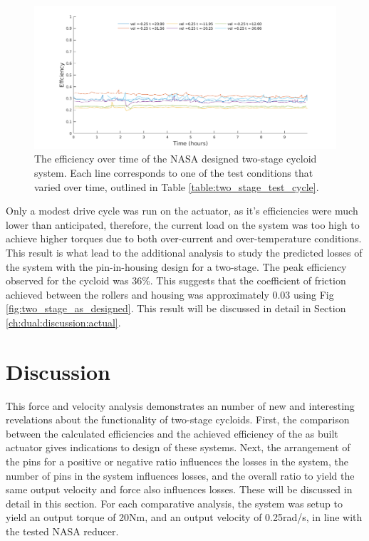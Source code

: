 \begin{figure}[h]
	\centering
	\includegraphics[width=0.75\linewidth]{fig/two_stage_eff}
   \caption{The efficiency over time of the NASA designed two-stage cycloid system. Each line corresponds to one of the test conditions that varied over time, outlined in Table \ref{table:two_stage_test_cycle}.}
   \label{fig:two_stage_eff}
\end{figure}

Only a modest drive cycle was run on the actuator, as it's efficiencies were much lower than anticipated, therefore, the current load on the system was too high to achieve higher torques due to both over-current and over-temperature conditions. This result is what lead to the additional analysis to study the predicted losses of the system with the pin-in-housing design for a two-stage. The peak efficiency observed for the cycloid was 36\%. This suggests that the coefficient of friction achieved between the rollers and housing was approximately 0.03 using Fig \ref{fig:two_stage_as_designed}. This result will be discussed in detail in Section \ref{ch:dual:discussion:actual}.


\section{Discussion} \label{ch:dual:discussion}

This force and velocity analysis demonstrates an number of new and interesting revelations about the functionality of two-stage cycloids. First, the comparison between the calculated efficiencies and the achieved efficiency of the as built actuator gives indications to design of these systems. Next, the arrangement of the pins for a positive or negative ratio influences the losses in the system, the number of pins in the system influences losses, and the overall ratio to yield the same output velocity and force also influences losses. These will be discussed in detail in this section. For each comparative analysis, the system was setup to yield an output torque of 20Nm, and an output velocity of 0.25rad/s, in line with the tested NASA reducer.


